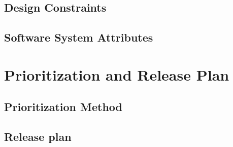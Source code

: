 \documentclass[onecolumn, draftclsnofoot,10pt, compsoc]{IEEEtran}
\begin{document}
    \subsection{Design Constraints}
    \subsection{Software System Attributes}


\section{Prioritization and Release Plan}
    \subsection{Prioritization Method}
    \subsection{Release plan}


% 
%
\end{document}
